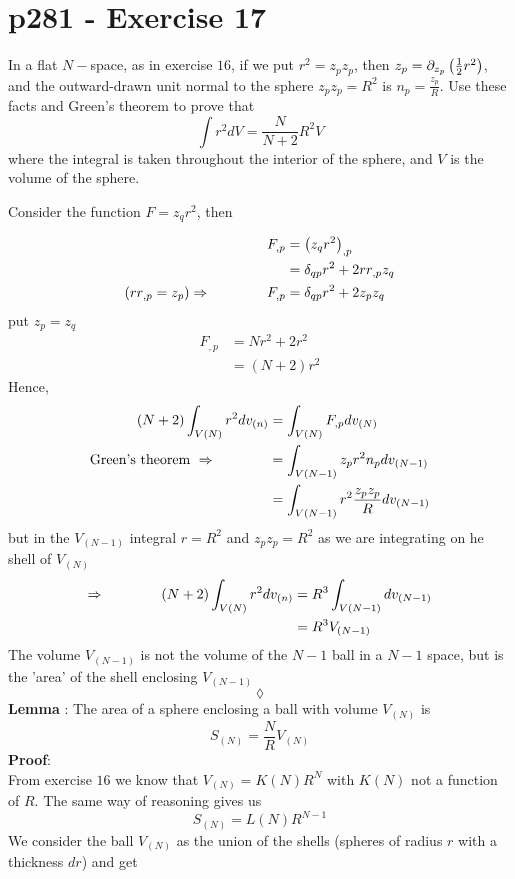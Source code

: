 \section{p281 - Exercise 17}
\begin{tcolorbox}
In a flat $N-$space, as in exercise $16$, if we put $r^2=z_pz_p$, then $z_p=\partial_{z_p}\left(\frac{1}{2} r^2\right)$, and the outward-drawn unit normal to the sphere $z_p z_p= R^2$ is $n_p= \frac{z_p}{R}$. Use these facts and Green's theorem to prove that
$$\int r^2dV = \frac{N}{N+2}R^2 V$$ where the integral is taken throughout the interior of the sphere, and $V$ is the volume of the sphere.
\end{tcolorbox}
Consider the function $F= z_q r^2$, then

\begin{align}
F_{,p}&= \left(z_q r^2\right)_{,p}\\
&= \delta_{qp}r^2+2rr_{,p}z_q\\
\left(r r_{,p}= z_p \right)\Rightarrow\quad\quad\quad\quad F_{,p}&= \delta_{qp}r^2+2z_pz_q\\
\end{align}
put $z_p=z_q$
\begin{align}
F_{,p}&= Nr^2+2r^2\\
&= \left(N+2 \right)r^2
\end{align}
Hence, 
\begin{align}
\left(N+2\right)\int_{V(N)} r^2 dv_{(n)} &= \int_{V(N)}F_{,p} dv_{(N)} \\
\text{Green's theorem }\Rightarrow\quad\quad\quad\quad &=  \int_{V(N-1)}z_p r^2 n_p dv_{(N-1)} \\
&=  \int_{V(N-1)}r^2 \frac{z_p z_p}{R} dv_{(N-1)} 
\end{align}
but in the $V_{(N-1)}$ integral $r=R^2$ and $z_p z_p = R^2$ as we are integrating on he shell of $V_{(N)}$
\begin{align}
\Rightarrow\quad\quad\quad\quad \left(N+2\right)\int_{V(N)} r^2 dv_{(n)} &=R^3 \int_{V(N-1)} dv_{(N-1)} \\
&=R^3 V_{(N-1)} 
\end{align}
The volume $V_{(N-1)} $ is not the volume of the $N-1$ ball in a $N-1$ space, but is the 'area' of the shell enclosing $V_{(N-1)}$
$$\lozenge$$
\textbf{Lemma} : The area of a sphere enclosing a ball with volume $V_{(N)}$ is 
$$ S_{(N)} = \frac{N}{R} V_{(N)}$$
\textbf{Proof}:\\
From exercise $16$ we know that $V_{(N)}= K(N)R^N$ with $K(N)$ not a function of $R$. The same way of reasoning gives us 
$$S_{(N)}= L(N)R^{N-1}$$  
We consider the ball $V_{(N)}$ as the union of the shells (spheres of radius $r$ with a thickness $dr$) and get

